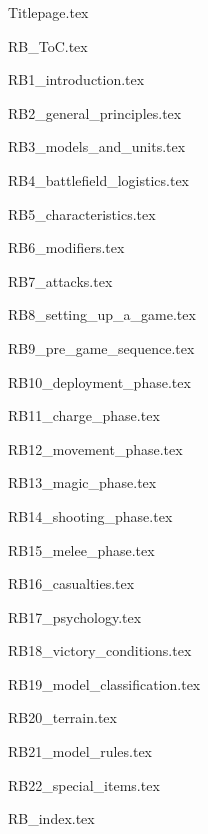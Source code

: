 \documentclass[a4paper,10pt]{article}
\begin{document}
{Titlepage.tex}

{RB_ToC.tex}


\clearpage
{RB1_introduction.tex}

\clearpage
{RB2_general_principles.tex}

\clearpage
{RB3_models_and_units.tex}

\clearpage
{RB4_battlefield_logistics.tex}

\clearpage
{RB5_characteristics.tex}

\clearpage
{RB6_modifiers.tex}

\clearpage
{RB7_attacks.tex}

\clearpage
{RB8_setting_up_a_game.tex}

\clearpage
{RB9_pre_game_sequence.tex}

\clearpage
{RB10_deployment_phase.tex}

\clearpage
{RB11_charge_phase.tex}

\clearpage
{RB12_movement_phase.tex}

\clearpage
{RB13_magic_phase.tex}

\clearpage
{RB14_shooting_phase.tex}

\clearpage
{RB15_melee_phase.tex}

\clearpage
{RB16_casualties.tex}

\clearpage
{RB17_psychology.tex}

\clearpage
{RB18_victory_conditions.tex}

\clearpage
{RB19_model_classification.tex}

\clearpage
{RB20_terrain.tex}

\clearpage
{RB21_model_rules.tex}

\clearpage
{RB22_special_items.tex}

\clearpage
{RB_index.tex}

\end{document}
